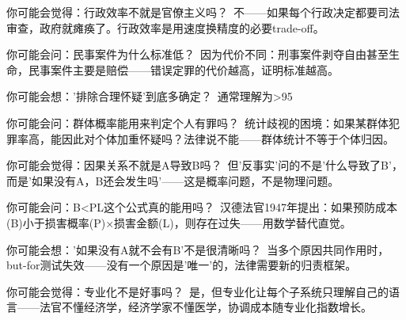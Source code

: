 \documentclass[a4paper,12pt]{book}
\begin{document}
	\begin{tcolorbox}[colback=yellow!5, title=\textit{读者行为预测}]
		你可能会觉得：行政效率不就是官僚主义吗？\ 不——如果每个行政决定都要司法审查，政府就瘫痪了。行政效率是用速度换精度的必要trade-off。
	\end{tcolorbox}


	\begin{tcolorbox}[colback=yellow!5, title=\textit{读者行为预测}]
		你可能会问：民事案件为什么标准低？\ 因为代价不同：刑事案件剥夺自由甚至生命，民事案件主要是赔偿——错误定罪的代价越高，证明标准越高。
	\end{tcolorbox}


	\begin{tcolorbox}[colback=yellow!5, title=\textit{读者行为预测}]
		你可能会想：'排除合理怀疑'到底多确定？\ 通常理解为>95%
	\end{tcolorbox}


	\begin{tcolorbox}[colback=yellow!5, title=\textit{读者行为预测}]
		你可能会问：群体概率能用来判定个人有罪吗？\ 统计歧视的困境：如果某群体犯罪率高，能因此对个体加重怀疑吗？法律说不能——群体统计不等于个体归因。
	\end{tcolorbox}


	\begin{tcolorbox}[colback=yellow!5, title=\textit{读者行为预测}]
		你可能会觉得：因果关系不就是A导致B吗？\ 但'反事实'问的不是'什么导致了B'，而是'如果没有A，B还会发生吗'——这是概率问题，不是物理问题。
	\end{tcolorbox}


	\begin{tcolorbox}[colback=yellow!5, title=\textit{读者行为预测}]
		你可能会问：B<PL这个公式真的能用吗？\ 汉德法官1947年提出：如果预防成本(B)小于损害概率(P)×损害金额(L)，则存在过失——用数学替代直觉。
	\end{tcolorbox}


	\begin{tcolorbox}[colback=yellow!5, title=\textit{读者行为预测}]
		你可能会想：'如果没有A就不会有B'不是很清晰吗？\ 当多个原因共同作用时，but-for测试失效——没有一个原因是'唯一'的，法律需要新的归责框架。
	\end{tcolorbox}


	\begin{tcolorbox}[colback=yellow!5, title=\textit{读者行为预测}]
		你可能会觉得：专业化不是好事吗？\ 是，但专业化让每个子系统只理解自己的语言——法官不懂经济学，经济学家不懂医学，协调成本随专业化指数增长。
	\end{tcolorbox}
\end{document}
